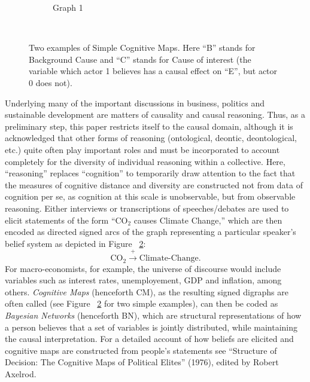 \documentclass[12pt]{article}
\begin{document}
\begin{figure}
\begin{subfigure}[b]{0.3\textwidth}
                \caption{Graph 1}
                \label{fig:tiger}
        \end{subfigure}
        ~ %
        \caption{Two examples of Simple Cognitive Maps. Here ``B'' stands for Background Cause and ``C'' stands for Cause of interest (the variable which actor 1 believes has a causal effect on ``E'', but actor 0 does not).}\label{fig:animals}
\end{figure}

Underlying many of the important discussions in business, politics and sustainable development are matters of causality and causal reasoning. Thus, as a preliminary step, this paper restricts itself to the causal domain, although it is acknowledged that other forms of reasoning (ontological, deontic, deontological, etc.) quite often play important roles and must be incorporated to account completely for the diversity of individual reasoning within a collective. Here, ``reasoning'' replaces ``cognition'' to temporarily draw attention to the fact that the measures of cognitive distance and diversity are constructed not from data of cognition per se, as cognition at this scale is unobservable, but from observable reasoning. Either interviews or transcriptions of speeches/debates are used to elicit statements of the form ``CO$_2$ causes Climate Change,'' which are then encoded as directed signed arcs of the graph representing a particular speaker's belief system as depicted in Figure ~\ref{fig:animals}:
$$\text{CO}_2 \xrightarrow{+} \text{Climate-Change}.$$
For macro-economists, for example, the universe of discourse would include variables such as interest rates, unemployement, GDP and inflation, among others. \textit{Cognitive Maps} (henceforth CM), as the resulting signed digraphs are often called (see Figure ~\ref{fig:animals} for two simple examples), can then be coded as \textit{Bayesian Networks} (henceforth BN), which are structural representations of how a person believes that a set of variables is jointly distributed, while maintaining the causal interpretation.
For a detailed account of how beliefs are elicited and cognitive maps are constructed from people's statements see ``Structure of Decision: The Cognitive Maps of Political Elites'' (1976), edited by Robert Axelrod.\\
\end{document}
